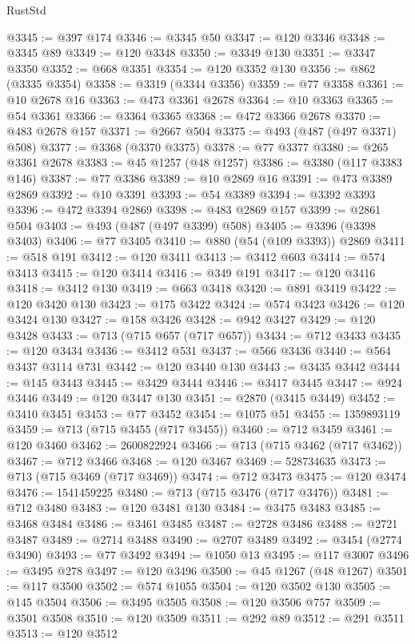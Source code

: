 \begin{lexlean}{RustStd}
\begin{coremodule}
@3345 := @397 @174
@3346 := @3345 @50
@3347 := @120 @3346
@3348 := @3345 @89
@3349 := @120 @3348
@3350 := @3349 @130
@3351 := @3347 @3350
@3352 := @668 @3351
@3354 := @120 @3352 @130
@3356 := @862 (@3335 @3354)
@3358 := @3319 (@3344 @3356)
@3359 := @77 @3358
@3361 := @10 @2678 @16
@3363 := @473 @3361 @2678
@3364 := @10 @3363
@3365 := @54 @3361
@3366 := @3364 @3365
@3368 := @472 @3366 @2678
@3370 := @483 @2678 @157
@3371 := @2667 @504
@3375 := @493 (@487 (@497 @3371) @508)
@3377 := @3368 (@3370 @3375)
@3378 := @77 @3377
@3380 := @265 @3361 @2678
@3383 := @45 @1257 (@48 @1257)
@3386 := @3380 (@117 @3383 @146)
@3387 := @77 @3386
@3389 := @10 @2869 @16
@3391 := @473 @3389 @2869
@3392 := @10 @3391
@3393 := @54 @3389
@3394 := @3392 @3393
@3396 := @472 @3394 @2869
@3398 := @483 @2869 @157
@3399 := @2861 @504
@3403 := @493 (@487 (@497 @3399) @508)
@3405 := @3396 (@3398 @3403)
@3406 := @77 @3405
@3410 := @880 (@54 (@109 @3393)) @2869
@3411 := @518 @191
@3412 := @120 @3411
@3413 := @3412 @603
@3414 := @574 @3413
@3415 := @120 @3414
@3416 := @349 @191
@3417 := @120 @3416
@3418 := @3412 @130
@3419 := @663 @3418
@3420 := @891 @3419
@3422 := @120 @3420 @130
@3423 := @175 @3422
@3424 := @574 @3423
@3426 := @120 @3424 @130
@3427 := @158 @3426
@3428 := @942 @3427
@3429 := @120 @3428
@3433 := @713 (@715 @657 (@717 @657))
@3434 := @712 @3433
@3435 := @120 @3434
@3436 := @3412 @531
@3437 := @566 @3436
@3440 := @564 @3437 @3114 @731
@3442 := @120 @3440 @130
@3443 := @3435 @3442
@3444 := @145 @3443
@3445 := @3429 @3444
@3446 := @3417 @3445
@3447 := @924 @3446
@3449 := @120 @3447 @130
@3451 := @2870 (@3415 @3449)
@3452 := @3410 @3451
@3453 := @77 @3452
@3454 := @1075 @51
@3455 := 1359893119
@3459 := @713 (@715 @3455 (@717 @3455))
@3460 := @712 @3459
@3461 := @120 @3460
@3462 := 2600822924
@3466 := @713 (@715 @3462 (@717 @3462))
@3467 := @712 @3466
@3468 := @120 @3467
@3469 := 528734635
@3473 := @713 (@715 @3469 (@717 @3469))
@3474 := @712 @3473
@3475 := @120 @3474
@3476 := 1541459225
@3480 := @713 (@715 @3476 (@717 @3476))
@3481 := @712 @3480
@3483 := @120 @3481 @130
@3484 := @3475 @3483
@3485 := @3468 @3484
@3486 := @3461 @3485
@3487 := @2728 @3486
@3488 := @2721 @3487
@3489 := @2714 @3488
@3490 := @2707 @3489
@3492 := @3454 (@2774 @3490)
@3493 := @77 @3492
@3494 := @1050 @13
@3495 := @117 @3007
@3496 := @3495 @278
@3497 := @120 @3496
@3500 := @45 @1267 (@48 @1267)
@3501 := @117 @3500
@3502 := @574 @1055
@3504 := @120 @3502 @130
@3505 := @145 @3504
@3506 := @3495 @3505
@3508 := @120 @3506 @757
@3509 := @3501 @3508
@3510 := @120 @3509
@3511 := @292 @89
@3512 := @291 @3511
@3513 := @120 @3512

\end{coremodule}
\end{lexlean}
